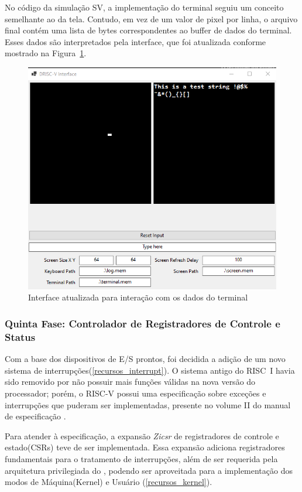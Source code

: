 \documentclass[
	12pt,				%
	openright,			%
	oneside,			%
	a4paper,			%
	english,			%
	french,				%
	spanish,			%
	brazil,				%
	]{abntex2}
\begin{document}
No código da simulação SV, a implementação do terminal seguiu um conceito semelhante ao da tela. Contudo, em vez de um valor de pixel por linha, o arquivo final contém uma lista de bytes correspondentes ao buffer de dados do terminal. Esses dados são interpretados pela interface, que foi atualizada conforme mostrado na Figura~\ref{fig:DRISC-V_interface_Final}.

\begin{figure}[h]
    \centering
    \includegraphics[width=0.75\linewidth]{LastSVInterface.png}
    \caption{Interface atualizada para interação com os dados do terminal}
    \label{fig:DRISC-V_interface_Final}
\end{figure}

\subsubsection{Quinta Fase: Controlador de Registradores de Controle e Status }

Com a base dos dispositivos de E/S prontos, foi decidida a adição de um novo sistema de interrupções(\ref{recursos_interrupt}). O sistema antigo do RISC~I havia sido removido por não possuir mais funções válidas na nova versão do processador; porém, o RISC-V possui uma especificação sobre exceções e interrupções que puderam ser implementadas, presente no volume II do manual de especificação .

Para atender à especificação, a expansão \textit{Zicsr} de registradores de controle e estado(CSRs) teve de ser implementada. Essa expansão adiciona registradores fundamentais para o tratamento de interrupções, além de ser requerida pela arquitetura privilegiada do , podendo ser aproveitada para a implementação dos modos de Máquina(Kernel) e Usuário (\ref{recursos_kernel}). 
\end{document}
